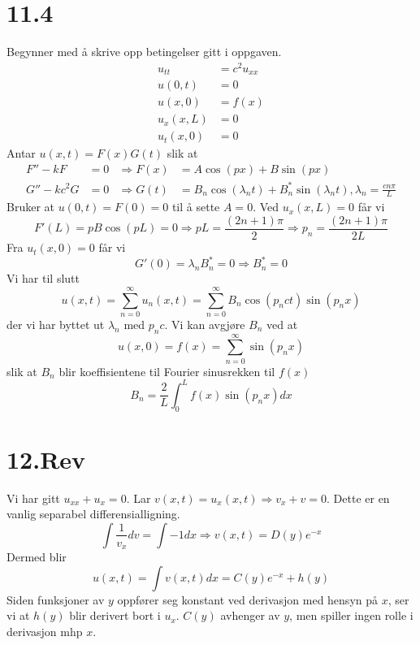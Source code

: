 \documentclass[11pt, a4paper, norsk]{NTNUoving}
\begin{document}
\section*{11.4}
\begin{oppgave}[19]
  Begynner med å skrive opp betingelser gitt i oppgaven.
  \begin{align*}
    u_{tt}&=c^2u_{xx}\\
    u(0,t) &= 0 \\
    u(x,0) &= f(x) \\
    u_x(x,L) &= 0 \\
    u_t(x,0) &= 0
  \end{align*}
  Antar $u(x,t)=F(x)G(t)$ slik at
  \begin{align*}
    F''-kF &= 0 &\Rightarrow F(x) &= A\cos(px)+B\sin(px)\\
    G''-kc^2 G &= 0 &\Rightarrow G(t) &= B_n\cos(\lambda_n t) + B_n^*\sin(\lambda_n t), \lambda_n=\frac{c n \pi}{L}
  \end{align*}
  Bruker at $u(0,t)=F(0)=0$ til å sette $A=0$. Ved $u_x(x,L)=0$ får vi
  \[
    F'(L)=pB\cos(pL)=0\Rightarrow pL = \frac{(2n+1)\pi}{2} \Rightarrow p_n=\frac{(2n+1)\pi}{2L}
  \]  
  Fra $u_t(x,0) =0$ får vi
  \[
    G'(0) = \lambda_nB_n^* = 0\Rightarrow B_n^* = 0
  \]  
  Vi har til slutt
  \[
    u(x,t)=\sum_{n=0}^{\infty}u_n(x,t)=\sum_{n=0}^{\infty}B_n\cos(p_nc t)\sin(p_nx)
  \]
  der vi har byttet ut $\lambda_n$ med $p_nc$. Vi kan avgjøre $B_n$ ved at
  \[
    u(x,0)=f(x)=\sum_{n=0}^{\infty}\sin(p_nx)
  \]
  slik at $B_n$ blir koeffisientene til Fourier sinusrekken til $f(x)$
  \[
    B_n=\frac{2}{L}\int_0^Lf(x)\sin(p_n x) dx
  \]  
\end{oppgave}
\section*{12.Rev}
\begin{oppgave}[18]
  Vi har gitt $u_{xx}+u_x=0$. Lar $v(x,t) = u_x(x,t)\Rightarrow v_x+v=0$. Dette er en vanlig separabel differensialligning.
  \[
    \int \frac{1}{v_x}dv = \int{-1}dx \Rightarrow v(x,t) = D(y)e^{-x} 
  \]
  Dermed blir
  \[
    u(x,t) = \int v(x,t) dx = C(y)e^{-x} + h(y)
  \]  
  Siden funksjoner av $y$ oppfører seg konstant ved derivasjon med hensyn på $x$, ser vi at $h(y)$ blir derivert bort i $u_x$. $C(y)$ avhenger av $y$, men spiller ingen rolle i derivasjon mhp $x$.  
\end{oppgave}
\end{document}
